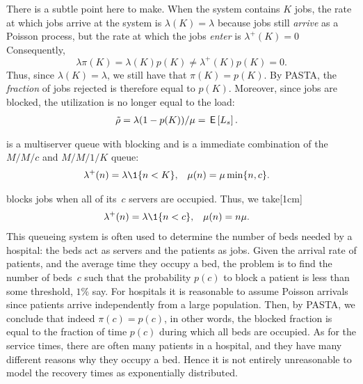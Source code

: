 \documentclass[stochastic-or.tex]{subfiles}
\begin{document}
There is a subtle point here to make.
When the system contains $K$ jobs, the rate at which jobs arrive at the system is $\lambda (K) = \lambda$ because jobs still \emph{arrive} as a Poisson process, but the rate at which the jobs \emph{enter} is $\lambda^{+}(K)= 0$ Consequently,
\begin{equation*}
\lambda \pi(K) = \lambda(K) p(K) \neq \lambda^{+}(K) p(K) = 0.
\end{equation*}
Thus, since $\lambda(K) = \lambda$,  we still have that $\pi(K) = p(K)$. By PASTA, the \emph{fraction} of jobs rejected is therefore equal to $p(K)$.
Moreover, since jobs are blocked, the utilization is no longer equal to the load:
\begin{align}\label{eq:mm1-2}
\tilde \rho &= \lambda (1-p(K))/\mu = \,\mathsf{E}\left[L_s\right].
\end{align}


 is a multiserver queue with blocking and is a immediate combination of the $M/M/c$ and $M/M/1/K$ queue:
\begin{align*}
\lambda^{+}(n) &= \lambda\1{n<K}, &\mu(n) &= \mu \min\{n, c\}.
\end{align*}

 blocks jobs when all of its~$c$ servers are occupied.
Thus, we take[1cm]
\begin{align*}
\lambda^{+}(n) &= \lambda\1{n<c}, & \mu(n) &= n \mu.
 \end{align*}
This queueing system is often used to determine the number of beds needed by a hospital: the beds act as servers and the patients as jobs.
Given the arrival rate of patients, and the average time they occupy a bed, the problem is to find the number of beds~$c$ such that the probability $p(c)$ to block a patient is less than some threshold, $1\%$ say.
For hospitals it is reasonable to assume Poisson arrivals since patients arrive independently from a large population.
Then, by PASTA, we conclude that indeed $\pi(c) = p(c)$, in other words, the blocked fraction is equal to the fraction of time $p(c)$ during which all beds are occupied.
As for the service times, there are often many patients in a hospital, and they have many different reasons why they occupy a bed.
Hence it is not entirely unreasonable to model the recovery times as exponentially distributed.
\end{document}
